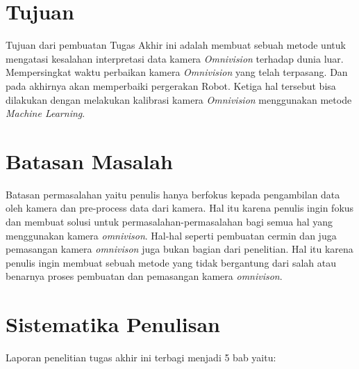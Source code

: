 \section{Tujuan}
\label{sec:Tujuan}

Tujuan dari pembuatan Tugas Akhir ini adalah membuat sebuah metode untuk mengatasi kesalahan interpretasi data kamera \emph{Omnivision} terhadap dunia luar. Mempersingkat waktu perbaikan kamera \emph{Omnivision} yang telah terpasang. Dan pada akhirnya akan memperbaiki pergerakan Robot. Ketiga hal tersebut bisa dilakukan dengan melakukan kalibrasi kamera \emph{Omnivision} menggunakan metode \emph{Machine Learning}.


\section{Batasan Masalah}
\label{sec:batasanmasalah}

Batasan permasalahan yaitu penulis hanya berfokus kepada pengambilan data oleh kamera dan pre-process data dari kamera. Hal itu karena penulis ingin fokus dan membuat solusi untuk permasalahan-permasalahan bagi semua hal yang menggunakan kamera \emph{omnivison}. Hal-hal seperti pembuatan cermin dan juga pemasangan kamera \emph{omnivison} juga bukan bagian dari penelitian. Hal itu karena penulis ingin membuat sebuah metode yang tidak bergantung dari salah atau benarnya proses pembuatan dan pemasangan kamera \emph{omnivison}.

\section{Sistematika Penulisan}
\label{sec:sistematikapenulisan}

Laporan penelitian tugas akhir ini terbagi menjadi 5 bab yaitu:

